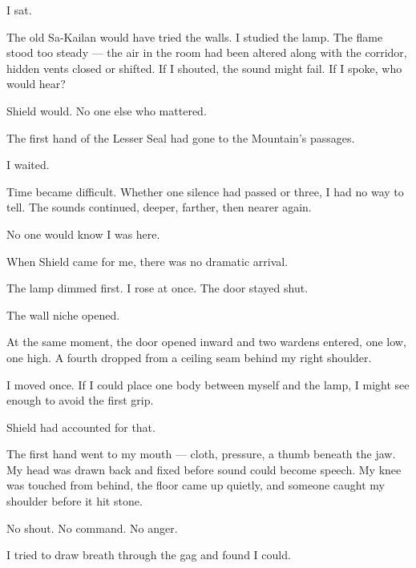 I sat.\par

The old Sa-Kailan would have tried the walls. I studied the lamp. The flame stood too steady --- the air in the room had been altered along with the corridor, hidden vents closed or shifted. If I shouted, the sound might fail. If I spoke, who would hear?\par

Shield would. No one else who mattered.\par

The first hand of the Lesser Seal had gone to the Mountain's passages.\par

I waited.\par

Time became difficult. Whether one silence had passed or three, I had no way to tell. The sounds continued, deeper, farther, then nearer again.\par

No one would know I was here.\par

When Shield came for me, there was no dramatic arrival.\par

The lamp dimmed first. I rose at once. The door stayed shut.\par

The wall niche opened.\par

At the same moment, the door opened inward and two wardens entered, one low, one high. A fourth dropped from a ceiling seam behind my right shoulder.\par

I moved once. If I could place one body between myself and the lamp, I might see enough to avoid the first grip.\par

Shield had accounted for that.\par

The first hand went to my mouth --- cloth, pressure, a thumb beneath the jaw. My head was drawn back and fixed before sound could become speech. My knee was touched from behind, the floor came up quietly, and someone caught my shoulder before it hit stone.\par

No shout. No command. No anger.\par

I tried to draw breath through the gag and found I could.\par

